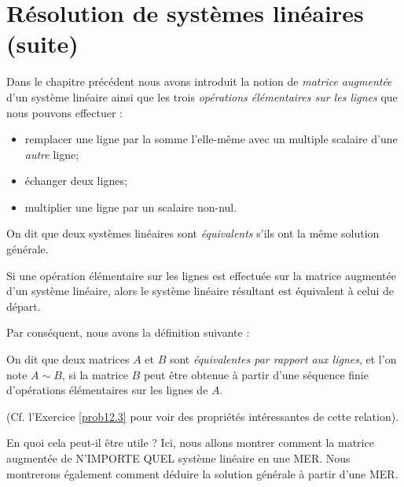 \chapter{Résolution de systèmes linéaires (suite)}
\label{chapter:Fr_14-solvingsystems}
   

Dans le chapitre pr\'ec\'edent nous avons introduit la notion de \emph{matrice augmentée}
d'un système linéaire ainsi que les trois \emph{opérations élémentaires sur les lignes}
que nous pouvons effectuer :
\begin{itemize}
\item remplacer une ligne par la somme l'elle-même avec un multiple scalaire d'une \emph{autre} ligne;
\item \'echanger deux lignes;
\item multiplier une ligne par un scalaire non-nul.
\end{itemize}

\begin{definition}
On dit que deux systèmes linéaires sont \emph{équivalents} s'ils
ont la même solution générale. 
\end{definition} 

\begin{theorem} 
Si une opération élémentaire sur les lignes est effectuée sur la matrice augmentée d'un système linéaire, alors le système linéaire résultant
est équivalent à celui de départ.
\end{theorem}

Par conséquent, nous avons la définition suivante :

\begin{definition}
On dit que deux matrices $A$ et $B$ sont \emph{équivalentes par rapport aux lignes}, et l'on note $A \sim B$, si la matrice
$B$ peut être obtenue à partir d'une séquence finie d'opérations élémentaires sur les lignes de $A$.
\end{definition}

(Cf. l'Exercice \ref{prob12.3} pour voir des propriétés intéressantes de cette relation).

En quoi cela peut-il être utile ?  Ici, nous allons montrer comment  la matrice augment\'ee de
N'IMPORTE QUEL système linéaire en une MER. Nous montrerons également comment d\'eduire la solution générale à partir d'une MER.

